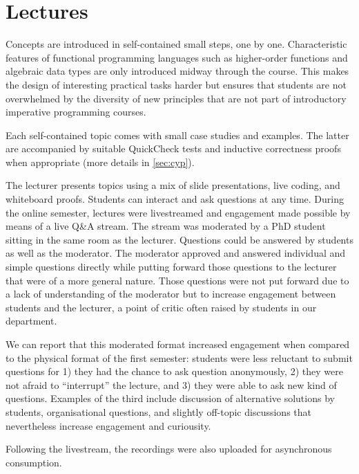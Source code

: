 \section{Lectures}

Concepts are introduced in self-contained small steps, one by one.
Characteristic features of functional programming languages such as
higher-order functions and algebraic data types are
only introduced midway through the course.
This makes the design of interesting practical tasks harder
but ensures that students are not overwhelmed by the diversity
of new principles that are not part of introductory imperative programming courses.

Each self-contained topic comes with small case studies and examples.
The latter are accompanied by suitable QuickCheck tests
and inductive correctness proofs when appropriate (more details in \cref{sec:cyp}).

The lecturer presents topics using a mix of
slide presentations,
live coding, and whiteboard proofs.
Students can interact and ask questions at any time.
During the online semester,
lectures were livestreamed and
engagement made possible by means of a live Q\&A stream.
The stream was moderated by a PhD student
sitting in the same room as the lecturer.
Questions could be answered by students as well as the moderator.
The moderator approved and answered individual and simple questions directly while putting forward those questions to the lecturer
that were of a more general nature.
Those questions were not put forward due to a lack of understanding of the moderator
but to increase engagement between students and the lecturer,
a point of critic often raised by students in our department.

We can report that this moderated format increased engagement when compared to the physical format of the first semester:
students were less reluctant to submit questions for
1) they had the chance to ask question anonymously,
2) they were not afraid to ``interrupt'' the lecture, and
3) they were able to ask new kind of questions.
Examples of the third include discussion of alternative solutions by students,
organisational questions,
and slightly off-topic discussions that nevertheless increase engagement and curiousity.

Following the livestream,
the recordings were also uploaded for asynchronous consumption.

